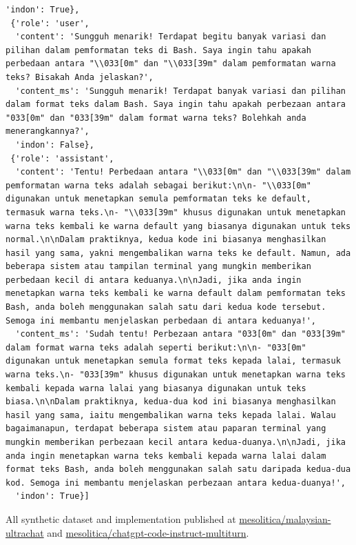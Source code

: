 \documentclass[preprint]{article}
\begin{document}
\begin{lstlisting}[breaklines=true]
  'indon': True},
 {'role': 'user',
  'content': 'Sungguh menarik! Terdapat begitu banyak variasi dan pilihan dalam pemformatan teks di Bash. Saya ingin tahu apakah perbedaan antara "\\033[0m" dan "\\033[39m" dalam pemformatan warna teks? Bisakah Anda jelaskan?',
  'content_ms': 'Sungguh menarik! Terdapat banyak variasi dan pilihan dalam format teks dalam Bash. Saya ingin tahu apakah perbezaan antara "033[0m" dan "033[39m" dalam format warna teks? Bolehkah anda menerangkannya?',
  'indon': False},
 {'role': 'assistant',
  'content': 'Tentu! Perbedaan antara "\\033[0m" dan "\\033[39m" dalam pemformatan warna teks adalah sebagai berikut:\n\n- "\\033[0m" digunakan untuk menetapkan semula pemformatan teks ke default, termasuk warna teks.\n- "\\033[39m" khusus digunakan untuk menetapkan warna teks kembali ke warna default yang biasanya digunakan untuk teks normal.\n\nDalam praktiknya, kedua kode ini biasanya menghasilkan hasil yang sama, yakni mengembalikan warna teks ke default. Namun, ada beberapa sistem atau tampilan terminal yang mungkin memberikan perbedaan kecil di antara keduanya.\n\nJadi, jika anda ingin menetapkan warna teks kembali ke warna default dalam pemformatan teks Bash, anda boleh menggunakan salah satu dari kedua kode tersebut. Semoga ini membantu menjelaskan perbedaan di antara keduanya!',
  'content_ms': 'Sudah tentu! Perbezaan antara "033[0m" dan "033[39m" dalam format warna teks adalah seperti berikut:\n\n- "033[0m" digunakan untuk menetapkan semula format teks kepada lalai, termasuk warna teks.\n- "033[39m" khusus digunakan untuk menetapkan warna teks kembali kepada warna lalai yang biasanya digunakan untuk teks biasa.\n\nDalam praktiknya, kedua-dua kod ini biasanya menghasilkan hasil yang sama, iaitu mengembalikan warna teks kepada lalai. Walau bagaimanapun, terdapat beberapa sistem atau paparan terminal yang mungkin memberikan perbezaan kecil antara kedua-duanya.\n\nJadi, jika anda ingin menetapkan warna teks kembali kepada warna lalai dalam format teks Bash, anda boleh menggunakan salah satu daripada kedua-dua kod. Semoga ini membantu menjelaskan perbezaan antara kedua-duanya!',
  'indon': True}]
\end{lstlisting}

All synthetic dataset and implementation published at \href{https://huggingface.co/datasets/mesolitica/malaysian-ultrachat}{mesolitica/malaysian-ultrachat} and \href{https://huggingface.co/datasets/mesolitica/chatgpt-code-instruct-multiturn}{mesolitica/chatgpt-code-instruct-multiturn}.
\end{document}
